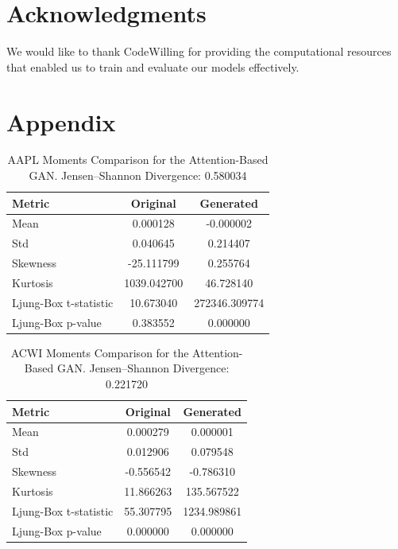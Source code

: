 \documentclass{article}
\begin{document}
\section*{Acknowledgments}

We would like to thank CodeWilling for providing the computational resources that enabled us to train and evaluate our models effectively.

\printbibliography

\appendix
\section{Appendix}

\begin{table}[ht]
\centering
\begin{tabular}{lcc}
\hline
\textbf{Metric} & \textbf{Original} & \textbf{Generated} \\
\hline
Mean     & 0.000128 & -0.000002 \\
Std      & 0.040645 & 0.214407 \\
Skewness & -25.111799 & 0.255764 \\
Kurtosis & 1039.042700 & 46.728140 \\
Ljung-Box t-statistic & 10.673040 & 272346.309774 \\
Ljung-Box p-value & 0.383552 & 0.000000 \\
\hline
\end{tabular}
\caption{AAPL Moments Comparison for the Attention-Based GAN.
Jensen--Shannon Divergence: 0.580034}
\label{tab:aapl_attention}
\end{table}

\begin{table}[ht]
\centering
\begin{tabular}{lcc}
\hline
\textbf{Metric} & \textbf{Original} & \textbf{Generated} \\
\hline
Mean     & 0.000279 & 0.000001 \\
Std      & 0.012906 & 0.079548 \\
Skewness & -0.556542 & -0.786310 \\
Kurtosis & 11.866263 & 135.567522 \\
Ljung-Box t-statistic & 55.307795 & 1234.989861 \\
Ljung-Box p-value & 0.000000 & 0.000000 \\
\hline
\end{tabular}
\caption{ACWI Moments Comparison for the Attention-Based GAN.
Jensen--Shannon Divergence: 0.221720}
\label{tab:acwi_attention}
\end{table}
\end{document}
